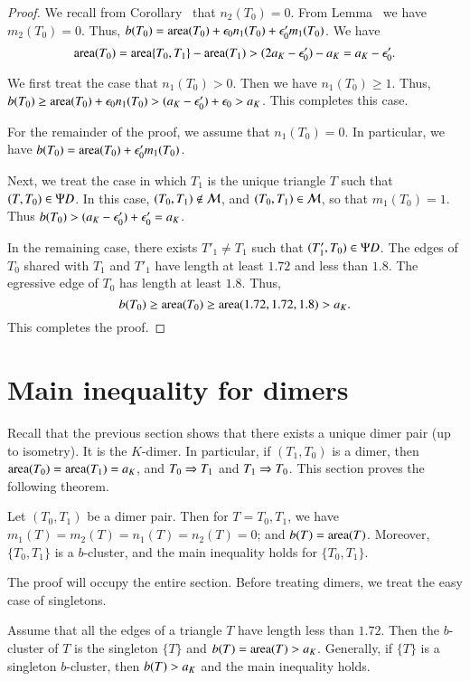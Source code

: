 \begin{proof}
We recall from Corollary~ that $n_2(T_0)=0$.  From Lemma~ we
have $m_2(T_0)=0$.  Thus, $b(T_0) = {\operatorname{area}}(T_0) + \epsilon_0 n_1(T_0) + \epsilon_0' m_1(T_0)$.
We have
\[
{\operatorname{area}}(T_0) = {\operatorname{area}}\{T_0,T_1\} - {\operatorname{area}}(T_1) > (2a_K-\epsilon_0') -a_K = a_K - \epsilon_0'.
\]

We first treat the case that $n_1(T_0)>0$.  Then we have $n_1(T_0)\ge 1$.
Thus, $b(T_0) \ge {\operatorname{area}}(T_0) + \epsilon_0 n_1(T_0) > (a_K - \epsilon_0') + \epsilon_0 > a_K$.
This completes this case.  

For the remainder of the proof, we assume that $n_1(T_0)=0$.  In particular, we have
$b(T_0) = {\operatorname{area}}(T_0) + \epsilon_0' m_1(T_0)$.

Next, we treat the case in which $T_1$ is the unique triangle $T$ such that $(T,T_0)\in\Psi D$.
In this case, $(T_0,T_1)\not\in\mathcal M$, and $(T_0,T_1)\in\mathcal M$, so that $m_1(T_0)=1$.  Thus
$b(T_0) > (a_K-\epsilon_0') + \epsilon_0' = a_K$.

In the remaining case, there exists $T'_1\ne T_1$ such that $(T'_1,T_0)\in\Psi D$.  The edges of
$T_0$ shared with $T_1$ and $T'_1$ have length at least $1.72$ and less than $1.8$.  The
egressive edge of $T_0$ has length at least $1.8$.  Thus,
\[
b(T_0) \ge {\operatorname{area}} (T_0) \ge {\operatorname{area}}(1.72,1.72,1.8) > a_K.
\]
This completes the proof.
\end{proof}


\section{Main inequality for dimers}

Recall that
the previous section shows that there exists a unique dimer pair (up to isometry).
It is the $K$-dimer.  In particular, if $(T_1,T_0)$ is a dimer, then 
${\operatorname{area}}(T_0)={\operatorname{area}}(T_1)=a_K$, and $T_0\Rightarrow T_1$ and $T_1\Rightarrow T_0$.
This section proves the following theorem.

\begin{theorem} Let $(T_0,T_1)$ be a dimer pair.  Then for $T=T_0,T_1$,
we have $m_1(T)=m_2(T) = n_1(T)=n_2(T) = 0$; and $b(T) = {\operatorname{area}}(T)$.
Moreover, $\{T_0,T_1\}$ is a $b$-cluster, and the main inequality holds for
$\{T_0,T_1\}$.
\end{theorem}

The proof will occupy the entire section.  Before treating dimers, we treat the
easy case of singletons.

\begin{lemma}  Assume that all the edges of a triangle $T$ have length less than $1.72$.
Then the $b$-cluster of $T$ is the singleton $\{T\}$ and $b(T) ={\operatorname{area}}(T) > a_K$.  Generally,
if $\{T\}$ is a singleton $b$-cluster, then $b(T) > a_K$ and the main inequality holds.
\end{lemma}

